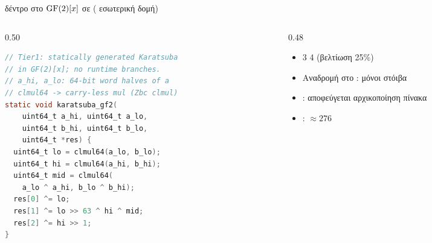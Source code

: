 \begin{frame}[fragile]{ δέντρο στο $\mathrm{GF}(2)[x]$ σε  ( εσωτερική δομή)}
  \begin{columns}[T]
    \begin{column}{0.50\textwidth}
\begin{lstlisting}[language=C,caption={}]
// Tier1: statically generated Karatsuba
// in GF(2)[x]; no runtime branches.
// a_hi, a_lo: 64-bit word halves of a
// clmul64 -> carry-less mul (Zbc clmul)
static void karatsuba_gf2(
    uint64_t a_hi, uint64_t a_lo,
    uint64_t b_hi, uint64_t b_lo,
    uint64_t *res) {
  uint64_t lo = clmul64(a_lo, b_lo);
  uint64_t hi = clmul64(a_hi, b_hi);
  uint64_t mid = clmul64(
    a_lo ^ a_hi, b_lo ^ b_hi);
  res[0] ^= lo;
  res[1] ^= lo >> 63 ^ hi ^ mid;
  res[2] ^= hi >> 1;
}
\end{lstlisting}
    \end{column}
    \begin{column}{0.48\textwidth}
      \begin{itemize}\small
        \item 3 \clmul {} 4 (βελτίωση 25\%)
        \item Αναδρομή στο :  μόνοι στόιβα
        \item {}: αποφεύγεται αρχικοποίηση πίνακα
        \item {}: $\approx\num{276}$ \clmul
      \end{itemize}
    \end{column}
  \end{columns}
\end{frame}
